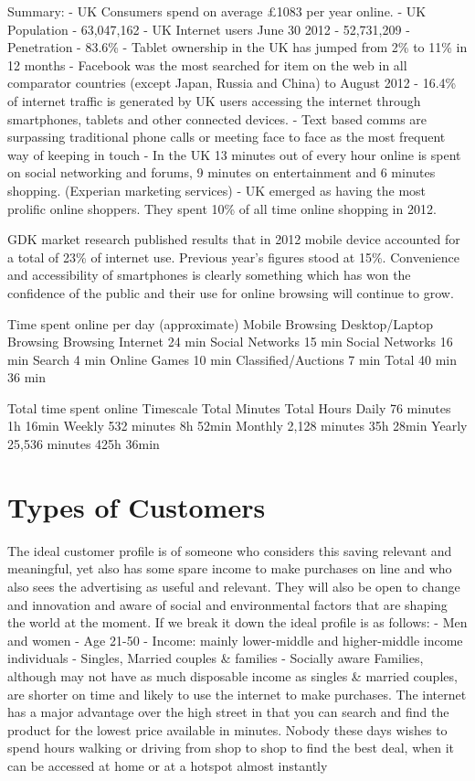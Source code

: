 \documentclass[letterpaper,10pt,openany,oneside,english]{sphinxmanual}
\begin{document}
Summary:
- UK Consumers spend on average £1083 per year online.
- UK Population - 63,047,162
- UK Internet users June 30 2012 - 52,731,209
- Penetration - 83.6\%
- Tablet ownership in the UK has jumped from 2\% to 11\% in 12 months
- Facebook was the most searched for item on the web in all comparator countries (except
Japan, Russia and China) to August 2012
- 16.4\% of internet traffic is generated by UK users accessing the internet through
smartphones, tablets and other connected devices.
- Text based comms are surpassing traditional phone calls or meeting face to face as the
most frequent way of keeping in touch
- In the UK 13 minutes out of every hour online is spent on social networking and forums,
9 minutes on entertainment and 6 minutes shopping. (Experian marketing services)
- UK emerged as having the most prolific online shoppers. They spent 10\% of all time
online shopping in 2012.

GDK market research published results that in 2012 mobile device accounted for a total of 23\%
of internet use. Previous year’s figures stood at 15\%. Convenience and accessibility of
smartphones is clearly something which has won the confidence of the public and their use for
online browsing will continue to grow.

Time spent online per day (approximate)
Mobile Browsing Desktop/Laptop Browsing
Browsing Internet 24 min Social Networks 15 min
Social Networks 16 min Search 4 min
Online Games 10 min
Classified/Auctions 7 min
Total 40 min 36 min

Total time spent online
Timescale Total Minutes Total Hours
Daily 76 minutes 1h 16min
Weekly 532 minutes 8h 52min
Monthly 2,128 minutes 35h 28min
Yearly 25,536 minutes 425h 36min


\section{Types of Customers}
\label{\detokenize{market-analysis:types-of-customers}}
The ideal customer profile is of someone who considers this saving relevant and meaningful, yet
also has some spare income to make purchases on line and who also sees the advertising as
useful and relevant. They will also be open to change and innovation and aware of social and
environmental factors that are shaping the world at the moment.
If we break it down the ideal profile is as follows:
- Men and women
- Age 21-50
- Income: mainly lower-middle and higher-middle income individuals
- Singles, Married couples \& families
- Socially aware
Families, although may not have as much disposable income as singles \& married couples, are
shorter on time and likely to use the internet to make purchases.
The internet has a major advantage over the high street in that you can search and find the
product for the lowest price available in minutes. Nobody these days wishes to spend hours
walking or driving from shop to shop to find the best deal, when it can be accessed at home or
at a hotspot almost instantly
\end{document}
